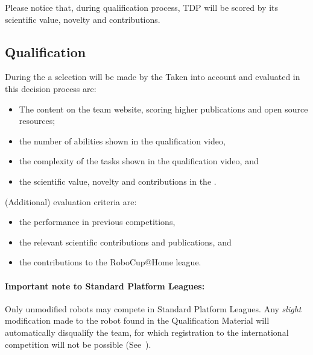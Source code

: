 Please notice that, during qualification process, TDP will be scored by its scientific value, novelty and contributions.


\subsection{Qualification}
\label{rule:qualification}

During the  a selection will be made by the  Taken into account and evaluated in this decision process are:
\begin{itemize}
	\item The content on the team website, scoring higher publications and open source resources;
	\item the number of abilities shown in the qualification video,
	\item the complexity of the tasks shown in the qualification video, and
	\item the scientific value, novelty and contributions in the . %
\end{itemize}
(Additional) evaluation criteria are:
\begin{itemize}
	\item the performance in previous competitions,
	\item the relevant scientific contributions and publications, and
	\item the contributions to the RoboCup@Home league.
\end{itemize}

\paragraph{Important note to Standard Platform Leagues:} Only unmodified robots may compete in Standard Platform Leagues. Any \textit{slight} modification made to the robot found in the Qualification Material will automatically disqualify the team, for which registration to the international competition will not be possible  (See~).



